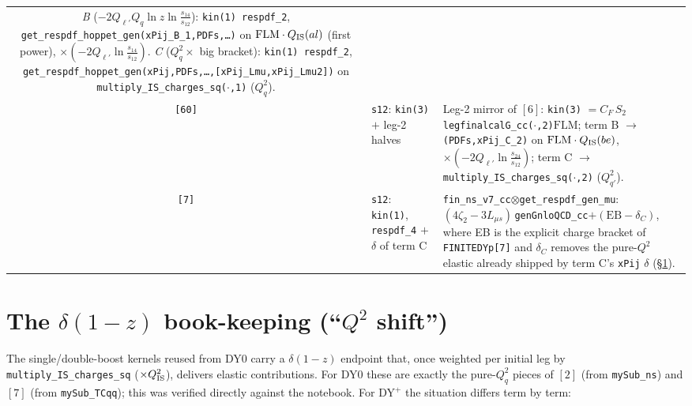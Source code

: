 \documentclass[11pt]{article}
\newcommand{\code}[1]{\texttt{#1}}
\newcommand{\FLM}{\ensuremath{\mathrm{FLM}}}
\newcommand{\Lms}{\ensuremath{L_{\mu s}}}
\newcommand{\zt}{\ensuremath{\zeta_2}}\newcommand{\ztt}{\ensuremath{\zeta_3}}
\begin{document}
\begin{center}
\begin{longtable}{@{}c p{4.7cm} p{8.7cm}@{}}
   \emph{B} ($-2Q_{\ell'}Q_q\ln z\ln\tfrac{s_{14}}{s_{12}}$): \code{kin(1) respdf\_2},
   \code{get\_respdf\_hoppet\_gen(xPij\_B\_1,PDFs,\dots)} on $\FLM\cdot Q_{\rm IS}(al)$ (first
   power), $\times(-2Q_{\ell'}\ln\tfrac{s_{14}}{s_{12}})$.\newline
   \emph{C} ($Q_q^2\times$ big bracket): \code{kin(1) respdf\_2},
   \code{get\_respdf\_hoppet\_gen(xPij,PDFs,\dots,[xPij\_Lmu,xPij\_Lmu2])} on
   \code{multiply\_IS\_charges\_sq($\cdot$,1)} ($Q_q^2$).\\
\code{[60]} & \code{s12}: \code{kin(3)} $+$ leg-2 halves
 & Leg-2 mirror of $[6]$: \code{kin(3)} $=C_F\,S_2\,$\code{legfinalcalG\_cc($\cdot$,2)}$\FLM$;
   term B $\to$ \code{(PDFs,xPij\_C\_2)} on $\FLM\cdot Q_{\rm IS}(be)$,
   $\times(-2Q_{\ell'}\ln\tfrac{s_{24}}{s_{12}})$; term C $\to$
   \code{multiply\_IS\_charges\_sq($\cdot$,2)} ($Q_{q'}^2$).\\
\code{[7]} & \code{s12}: \code{kin(1)}, \code{respdf\_4} $+$ $\delta$ of term C
 & \code{fin\_ns\_v7\_cc}$\otimes$\code{get\_respdf\_gen\_mu}:
   $(4\zt-3\Lms)\,$\code{genGnloQCD\_cc}$+(\mathrm{EB}-\delta_C)$, where EB is the explicit
   charge bracket of \code{FINITEDYp[7]} and $\delta_C$ removes the pure-$Q^2$ elastic already
   shipped by term C's \code{xPij} $\delta$ (\S\ref{sec:shift}).\\
\bottomrule
\end{longtable}
\end{center}

\section{The $\delta(1-z)$ book-keeping (``$Q^2$ shift'')}
\label{sec:shift}

The single/double-boost kernels reused from DY0 carry a $\delta(1-z)$ endpoint that, once
weighted per initial leg by \code{multiply\_IS\_charges\_sq} ($\times Q_{\rm IS}^2$), delivers
elastic contributions. For DY0 these are exactly the pure-$Q_q^2$ pieces of $[2]$ (from
\code{mySub\_ns}) and $[7]$ (from \code{mySub\_TCqq}); this was verified directly against the
notebook. For DY${}^+$ the situation differs term by term:
\end{document}
